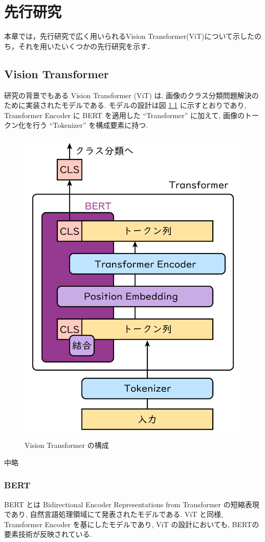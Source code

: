 \chapter{先行研究}\label{sec:RecentWorks}
本章では，先行研究で広く用いられるVision Transformer(ViT)について示したのち，それを用いたいくつかの先行研究を示す．

\section{Vision Transformer}\label{sec:ViT}

研究の背景でもある Vision Transformer (ViT) \cite{Dosovitskiy_2021} は,
画像のクラス分類問題解決のために実装されたモデルである. 
モデルの設計は図 \ref{fig:vit_design} に示すとおりであり, 
Transformer Encoder \cite{Vaswani_2017} に BERT \cite{Devlin_2019} を適用した
``Transformer'' に加えて, 画像のトークン化を行う ``Tokenizer'' を構成要素に持つ. 
\begin{figure}[htbp]
  \centering
  \includegraphics[width=.4\textwidth]{figure/vit_design.png}
  \caption{Vision Transformer の構成}
  \label{fig:vit_design}
\end{figure}

中略

\subsection{BERT}\label{sec:bert}
BERT \cite{Devlin_2019} とは Bidirectional Encoder Representations from
Transformer の短縮表現であり, 自然言語処理領域にて発表されたモデルである.
ViT と同様, Transformer Encoder を基にしたモデルであり,
ViT の設計においても, BERTの要素技術が反映されている.

